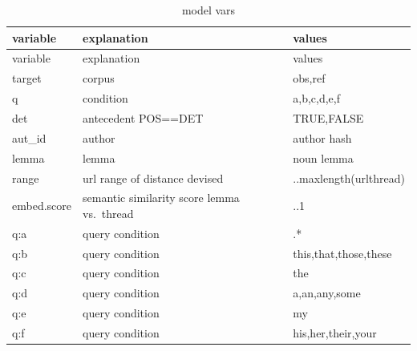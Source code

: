 \documentclass[12pt,a4paper]{article}
\begin{document}
\begin{longtable}[]{@{}
  >{\raggedright\arraybackslash}p{}
  >{\raggedright\arraybackslash}p{}
  >{\raggedright\arraybackslash}p{}@{}}
\caption{\label{tab:legend}model vars}\tabularnewline
\toprule\noalign{}
\begin{minipage}[b]{\linewidth}\raggedright
variable
\end{minipage} & \begin{minipage}[b]{\linewidth}\raggedright
explanation
\end{minipage} & \begin{minipage}[b]{\linewidth}\raggedright
values
\end{minipage} \\
\midrule\noalign{}
\endfirsthead
\toprule\noalign{}
\begin{minipage}[b]{\linewidth}\raggedright
variable
\end{minipage} & \begin{minipage}[b]{\linewidth}\raggedright
explanation
\end{minipage} & \begin{minipage}[b]{\linewidth}\raggedright
values
\end{minipage} \\
\midrule\noalign{}
\endhead
\bottomrule\noalign{}
\endlastfoot
target & corpus & obs,ref \\
q & condition & a,b,c,d,e,f \\
det & antecedent POS==DET & TRUE,FALSE \\
aut\_id & author & author hash \\
lemma & lemma & noun lemma \\
range & url range of distance devised & 1..maxlength(urlthread) \\
embed.score & semantic similarity score lemma vs.~thread & 0..1 \\
q:a & query condition & .* \\
q:b & query condition & this,that,those,these \\
q:c & query condition & the \\
q:d & query condition & a,an,any,some \\
q:e & query condition & my \\
q:f & query condition & his,her,their,your \\
\end{longtable}
\end{document}
